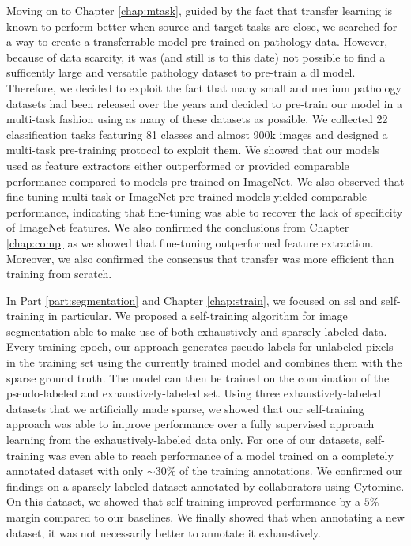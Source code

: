 Moving on to Chapter \ref{chap:mtask}, guided by the fact that transfer learning is known to perform better when source and target tasks are close, we searched for a way to create a transferrable model pre-trained on pathology data. However, because of data scarcity, it was (and still is to this date) not possible to find a sufficently large and versatile pathology dataset to pre-train a \acrlong{dl} model. Therefore, we decided to exploit the fact that many small and medium pathology datasets had been released over the years and decided to pre-train our model in a multi-task fashion using as many of these datasets as possible. We collected 22 classification tasks featuring 81 classes and almost 900k images and designed a multi-task pre-training protocol to exploit them. We showed that our models used as feature extractors either outperformed or provided comparable performance compared to models pre-trained on ImageNet. We also observed that fine-tuning multi-task or ImageNet pre-trained models yielded comparable performance, indicating that fine-tuning was able to recover the lack of specificity of ImageNet features. We also confirmed the conclusions from Chapter \ref{chap:comp} as we showed that fine-tuning outperformed feature extraction. Moreover, we also confirmed the consensus that transfer was more efficient than training from scratch.

In Part \ref{part:segmentation} and Chapter \ref{chap:strain}, we focused on \acrlong{ssl} and self-training in particular. We proposed a self-training algorithm for image segmentation able to make use of both exhaustively and sparsely-labeled data. Every training epoch, our approach generates pseudo-labels for unlabeled pixels in the training set using the currently trained model and combines them with the sparse ground truth. The model can then be trained on the combination of the pseudo-labeled and exhaustively-labeled set. Using three exhaustively-labeled datasets that we artificially made sparse, we showed that our self-training approach was able to improve performance over a fully supervised approach learning from the exhaustively-labeled data only. For one of our datasets, self-training was even able to reach performance of a model trained on a completely annotated dataset with only $\sim 30\%$ of the training annotations. We confirmed our findings on a sparsely-labeled dataset annotated by collaborators using Cytomine. On this dataset, we showed that self-training improved performance by a $5\%$ margin compared to our baselines. We finally showed that when annotating a new dataset, it was not necessarily better to annotate it exhaustively. 

